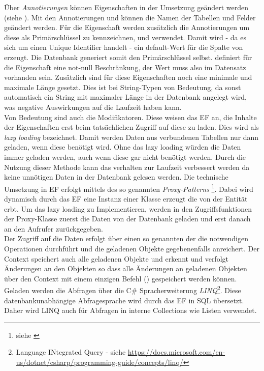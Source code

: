 Über \emph{Annotierungen} können Eigenschaften in der Umsetzung geändert werden (siehe \parencite{eftut}). Mit den Annotierungen  und  können die Namen der Tabellen und Felder geändert werden. Für die Eigenschaft   werden zusätzlich die Annotierungen  um diese als Primärschlüssel zu kennzeichnen, und  verwendet. Damit wird - da es sich um einen Unique Identifier handelt - ein default-Wert für die Spalte von  erzeugt. Die Datenbank generiert somit den Primärschlüssel selbst.  definiert für die Eigenschaft  eine not-null Beschränkung, der Wert muss also im Datensatz vorhanden sein. Zusätzlich sind für diese Eigenschaften noch eine minimale und maximale Länge gesetzt. Dies ist bei String-Typen von Bedeutung, da sonst automatisch ein String mit maximaler Länge in der Datenbank angelegt wird, was negative Auswirkungen auf die Laufzeit haben kann. 
\\Von Bedeutung sind auch die  Modifikatoren. Diese weisen das EF an, die Inhalte der Eigenschaften erst beim tatsächlichen Zugriff auf diese zu laden. Dies wird als \emph{lazy loading} bezeichnet. Damit werden Daten aus verbundenen Tabellen nur dann geladen, wenn diese benötigt wird. Ohne das lazy loading würden die Daten immer geladen werden, auch wenn diese gar nicht benötigt werden. Durch die Nutzung dieser Methode kann das verhalten zur Laufzeit verbessert werden da keine unnötigen Daten in der Datenbank gelesen werden. Die technische Umsetzung in EF erfolgt mittels des so genannten \emph{Proxy-Patterns} \footnote{ siehe \parencite[S. 207ff]{gamma1995}}\parencite{ms_proxy}. Dabei wird dynamisch durch das EF eine Instanz einer Klasse erzeugt die von der Entität erbt. Um das lazy loading zu Implementieren, werden in den Zugriffsfunktionen der Proxy-Klasse zuerst die Daten von der Datenbank geladen und erst danach an den Aufrufer zurückgegeben.
\\Der Zugriff auf die Daten erfolgt über einen so genannten  der die notwendigen Operationen durchführt und die geladenen Objekte gegebenenfalls anreichert. Der Context speichert auch alle geladenen Objekte und erkennt und verfolgt Änderungen an den Objekten so dass alle Änderungen an geladenen Objekten über den Context mit einem einzigen Befehl () gespeichert werden können.
\\Geladen werden die Abfragen über die C\# Spracherweiterung \emph{LINQ}\footnote{Language INtegrated Query - siehe \url{https://docs.microsoft.com/en-us/dotnet/csharp/programming-guide/concepts/linq/}}. Diese datenbankunabhängige Abfragesprache wird durch das EF in SQL übersetzt. Daher wird LINQ auch für Abfragen in interne Collections wie Listen verwendet.
